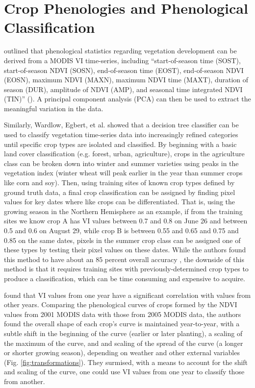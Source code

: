 \section{Crop Phenologies and Phenological Classification}
\label{chapter:methods:phenology-fitting}

\citeauthor{gu2010phenological} outlined that phenological statistics regarding vegetation development can be derived from a MODIS VI time-series, including “start-of-season time (SOST), start-of-season NDVI (SOSN), end-of-season time (EOST), end-of-season NDVI (EOSN), maximum NDVI (MAXN), maximum NDVI time (MAXT), duration of season (DUR), amplitude of NDVI (AMP), and seasonal time integrated NDVI (TIN)” \mkbibparens{\citeyear[529]{gu2010phenological}}. A principal component analysis (PCA) can then be used to extract the meaningful variation in the data.

Similarly, Wardlow, Egbert, et al. \autocites{wardlow2002discriminating}{wardlow2005state-level}{wardlow2007analysis}{wardlow2008large-area} showed that a decision tree classifier can be used to classify vegetation time-series data into increasingly refined categories until specific crop types are isolated and classified. By beginning with a basic land cover classification (e.g. forest, urban, agriculture), crops in the agriculture class can be broken down into winter and summer varieties using peaks in the vegetation index (winter wheat will peak earlier in the year than summer crops like corn and soy). Then, using training sites of known crop types defined by ground truth data, a final crop classification can be assigned by finding pixel values for key dates where like crops can be differentiated. That is, using the growing season in the Northern Hemisphere as an example, if from the training sites we know crop A has VI values between 0.7 and 0.8 on June 26 and between 0.5 and 0.6 on August 29, while crop B is between 0.55 and 0.65 and 0.75 and 0.85 on the same dates, pixels in the summer crop class can be assigned one of these types by testing their pixel values on these dates. While the authors found this method to have about an 85 percent overall accuracy \autocite{wardlow2005state-level}, the downside of this method is that it requires training sites with previously-determined crop types to produce a classification, which can be time consuming and expensive to acquire.

\textcite{masialeti2010a-comparative} found that VI values from one year have a significant correlation with values from other years. Comparing the phenological curves of crops formed by the NDVI values from 2001 MODIS data \autocite[from][]{wardlow2005state-level} with those from 2005 MODIS data, the authors found the overall shape of each crop's curve is maintained year-to-year, with a subtle shift in the beginning of the curve (earlier or later planting), a scaling of the maximum of the curve, and and scaling of the spread of the curve (a longer or shorter growing season), depending on weather and other external variables (Fig. \ref{fig:transformations}). They surmised, with a means to account for the shift and scaling of the curve, one could use VI values from one year to classify those from another.

